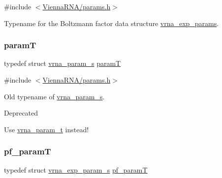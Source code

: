 {\ttfamily \#include $<$\mbox{\hyperlink{params_8h}{Vienna\+R\+N\+A/params.\+h}}$>$}



Typename for the Boltzmann factor data structure \mbox{\hyperlink{group__energy__parameters_gab1f3016f96aa96bff020cdd904605afa}{vrna\+\_\+exp\+\_\+params}}. 

\mbox{\label{group__energy__parameters_ga857dde86357d306cc902f0d8b2797659}} 
\subsubsection{\texorpdfstring{paramT}{paramT}}
{\footnotesize\ttfamily typedef struct \mbox{\hyperlink{group__energy__parameters_structvrna__param__s}{vrna\+\_\+param\+\_\+s}} \mbox{\hyperlink{group__energy__parameters_ga857dde86357d306cc902f0d8b2797659}{paramT}}}



{\ttfamily \#include $<$\mbox{\hyperlink{params_8h}{Vienna\+R\+N\+A/params.\+h}}$>$}



Old typename of \mbox{\hyperlink{group__energy__parameters_structvrna__param__s}{vrna\+\_\+param\+\_\+s}}. 

\begin{DoxyRefDesc}{Deprecated}
\item[\mbox{\hyperlink{deprecated__deprecated000092}{Deprecated}}]Use \mbox{\hyperlink{group__energy__parameters_ga8a69ca7d787e4fd6079914f5343a1f35}{vrna\+\_\+param\+\_\+t}} instead! \end{DoxyRefDesc}
\mbox{\label{group__energy__parameters_ga8bffe1828e2cbec101769f5cc0b1535b}} 
\subsubsection{\texorpdfstring{pf\+\_\+paramT}{pf\_paramT}}
{\footnotesize\ttfamily typedef struct \mbox{\hyperlink{group__energy__parameters_structvrna__exp__param__s}{vrna\+\_\+exp\+\_\+param\+\_\+s}} \mbox{\hyperlink{group__energy__parameters_ga8bffe1828e2cbec101769f5cc0b1535b}{pf\+\_\+paramT}}}



